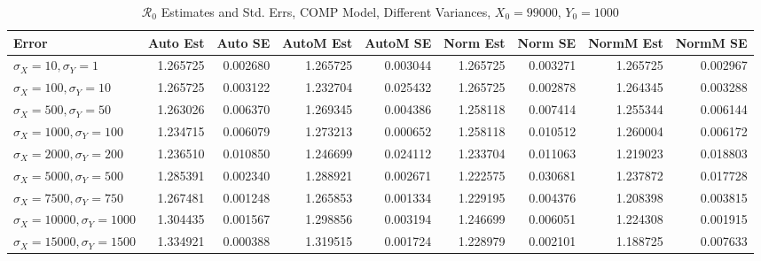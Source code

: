 \documentclass[12pt]{article}
\newcommand{\rr}{\ensuremath{\mathcal{R}_0}}
\begin{document}
\begin{table}[H]
	
	\caption{$\rr$ Estimates and Std. Errs, COMP Model, 
		Different Variances, $X_0 = 99000$, $Y_0 = 1000$}
	\begin{footnotesize}
		\hskip -1.7cm
		\begin{tabular}{l|r|r|r|r|r|r|r|r}
			\hline
			Error & Auto Est & Auto SE & AutoM Est & AutoM SE & Norm Est & Norm SE & NormM Est & NormM SE\\
			\hline
			$\sigma_X = 10, \sigma_Y = 1$ & 1.265725 & 0.002680 & 1.265725 & 0.003044 & 1.265725 & 0.003271 & 1.265725 & 0.002967\\
			\hline
			$\sigma_X = 100, \sigma_Y = 10$ & 1.265725 & 0.003122 & 1.232704 & 0.025432 & 1.265725 & 0.002878 & 1.264345 & 0.003288\\
			\hline
			$\sigma_X = 500, \sigma_Y = 50$ & 1.263026 & 0.006370 & 1.269345 & 0.004386 & 1.258118 & 0.007414 & 1.255344 & 0.006144\\
			\hline
			$\sigma_X = 1000, \sigma_Y = 100$ & 1.234715 & 0.006079 & 1.273213 & 0.000652 & 1.258118 & 0.010512 & 1.260004 & 0.006172\\
			\hline
			$\sigma_X = 2000, \sigma_Y = 200$ & 1.236510 & 0.010850 & 1.246699 & 0.024112 & 1.233704 & 0.011063 & 1.219023 & 0.018803\\
			\hline
			$\sigma_X = 5000, \sigma_Y = 500$ & 1.285391 & 0.002340 & 1.288921 & 0.002671 & 1.222575 & 0.030681 & 1.237872 & 0.017728\\
			\hline
			$\sigma_X = 7500, \sigma_Y = 750$ & 1.267481 & 0.001248 & 1.265853 & 0.001334 & 1.229195 & 0.004376 & 1.208398 & 0.003815\\
			\hline
			$\sigma_X = 10000, \sigma_Y = 1000$ & 1.304435 & 0.001567 & 1.298856 & 0.003194 & 1.246699 & 0.006051 & 1.224308 & 0.001915\\
			\hline
			$\sigma_X = 15000, \sigma_Y = 1500$ & 1.334921 & 0.000388 & 1.319515 & 0.001724 & 1.228979 & 0.002101 & 1.188725 & 0.007633\\
			\hline
		\end{tabular}
	\end{footnotesize}
\end{table}
\end{document}
